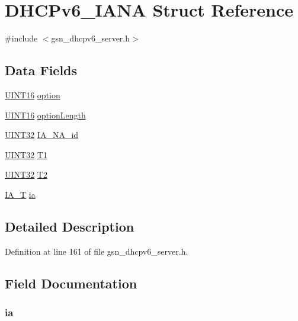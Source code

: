 \hypertarget{a00012}{
\section{DHCPv6\_\-IANA Struct Reference}
\label{a00012}
}


{\ttfamily \#include $<$gsn\_\-dhcpv6\_\-server.h$>$}

\subsection*{Data Fields}
\begin{DoxyCompactItemize}
\item 
\hyperlink{a00660_ga09f1a1fb2293e33483cc8d44aefb1eb1}{UINT16} \hyperlink{a00012_a4ea9b0ff2f7afc39a9ce6e27efea3c1a}{option}
\item 
\hyperlink{a00660_ga09f1a1fb2293e33483cc8d44aefb1eb1}{UINT16} \hyperlink{a00012_a34af08bbd90310de2d99728fb4bc5aee}{optionLength}
\item 
\hyperlink{a00660_gae1e6edbbc26d6fbc71a90190d0266018}{UINT32} \hyperlink{a00012_a20eae1f6e8c86f9c187b44aa162e9d29}{IA\_\-NA\_\-id}
\item 
\hyperlink{a00660_gae1e6edbbc26d6fbc71a90190d0266018}{UINT32} \hyperlink{a00012_abddb72aaa9095129e618bd0621412ab3}{T1}
\item 
\hyperlink{a00660_gae1e6edbbc26d6fbc71a90190d0266018}{UINT32} \hyperlink{a00012_ae2a551175ad9eef4bcf84ee25773c78b}{T2}
\item 
\hyperlink{a00448}{IA\_\-T} \hyperlink{a00012_a165f2b428ad6e1b58bc9899c9b720274}{ia}
\end{DoxyCompactItemize}


\subsection{Detailed Description}


Definition at line 161 of file gsn\_\-dhcpv6\_\-server.h.



\subsection{Field Documentation}
\hypertarget{a00012_a165f2b428ad6e1b58bc9899c9b720274}{
\subsubsection[{ia}]{ {\bf ia}}}
\label{a00012_a165f2b428ad6e1b58bc9899c9b720274}


